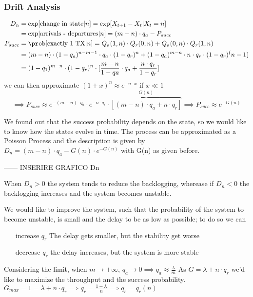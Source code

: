 \subsubsection{Drift Analysis}
\begin{equation}\begin{split}
  D_n &= \exp[\text{change in state} | n] = \exp[X_{t+1} - X_t | X_t = n] \\
  &= \exp[\text{arrivals - departures} | n ] = (m-n) \cdot q_a - P_{succ} \\
  P_{succ}&= \prob[\text{exactly 1 TX}|n] = Q_a(1,n) \cdot Q_r(0,n) + Q_a(0,n) \cdot Q_r(1,n) \\
  &= (m-n)\cdot(1-q_a)^{n-m-1} \cdot q_a \cdot(1-q_r)^n + (1-q_a)^{m-n}\cdot n \cdot q_r \cdot (1-q_r)^(n-1) \\
  &= (1-q_1)^{m-n} \cdot (1-q_r)^n \cdot [\frac{m-n}{1-qa}\cdot q_a + \frac{n \cdot q_r}{1-q_r}]
\end{split}\end{equation}
we can then approximate $(1+x)^n \approx e^{-n \cdot x}$ if $x \ll 1$
\begin{equation}
  \implies P_{succ} \approx e^{-(m-n)\cdot q_a} \cdot e^{-n\cdot q_r} \cdot \overbrace{[(m-n) \cdot q_a + n \cdot q_r]}^{G(n)}
  \implies P_{succ} \approx e^{-G(n)}
\end{equation}

We found out that the success probability depends on the state, so we would like to know how the states evolve in time.
The process can be approximated as a Poisson Process and the description is given by $D_n = (m-n)\cdot q_a - G(n) \cdot e^{-G(n)}$
with G(n) as given before.

------ INSERIRE GRAFICO Dn

When $D_n>0$ the system tends to reduce the backlogging, wherease if $D_n<0$ the backlogging
increases and the system becomes unstable.

We would like to improve the system, such that the probability of the system to become
unstable, is small and the delay to be as low as possible; to do so we can
\begin{enumerate}
  \item[increase $q_r$] The delay gets smaller, but the stability get worse
  \item[decrease $q_r$] the delay increases, but the system is more stable
\end{enumerate}

Considering the limit, when $m \to +\infty$, $q_a \to 0 \implies q_a \approx \frac{\lambda}{m}$
As $G=\lambda + n \cdot q_r$ we'd like to maximize the throughput and the success probability.
$G_{max}=1 = \lambda + n  \cdot q_r \implies q_r = \frac{1-\lambda}{n} \implies q_r = q_r(n)$

